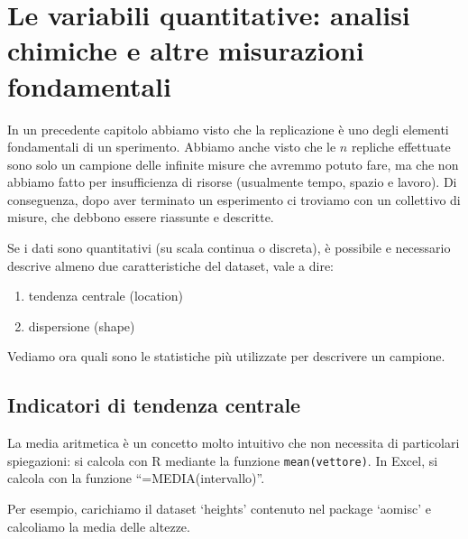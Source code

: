 \documentclass[a4paper,12pt,oneside]{book}
\providecommand{\tightlist}{%
  \setlength{\itemsep}{0pt}\setlength{\parskip}{0pt}}
\newenvironment{Shaded}{\begin{snugshade}}{\end{snugshade}}
\newcommand{\KeywordTok}[1]{\textcolor[rgb]{0.13,0.29,0.53}{\textbf{#1}}}
\newcommand{\OperatorTok}[1]{\textcolor[rgb]{0.81,0.36,0.00}{\textbf{#1}}}
\newcommand{\NormalTok}[1]{#1}
\begin{document}
\section{Le variabili quantitative: analisi chimiche e altre misurazioni
fondamentali}\label{le-variabili-quantitative-analisi-chimiche-e-altre-misurazioni-fondamentali}

In un precedente capitolo abbiamo visto che la replicazione è uno degli
elementi fondamentali di un sperimento. Abbiamo anche visto che le \(n\)
repliche effettuate sono solo un campione delle infinite misure che
avremmo potuto fare, ma che non abbiamo fatto per insufficienza di
risorse (usualmente tempo, spazio e lavoro). Di conseguenza, dopo aver
terminato un esperimento ci troviamo con un collettivo di misure, che
debbono essere riassunte e descritte.

Se i dati sono quantitativi (su scala continua o discreta), è possibile
e necessario descrive almeno due caratteristiche del dataset, vale a
dire:

\begin{enumerate}
\def\labelenumi{\arabic{enumi}.}
\tightlist
\item
  tendenza centrale (location)
\item
  dispersione (shape)
\end{enumerate}

Vediamo ora quali sono le statistiche più utilizzate per descrivere un
campione.

\subsection{Indicatori di tendenza
centrale}\label{indicatori-di-tendenza-centrale}

La media aritmetica è un concetto molto intuitivo che non necessita di
particolari spiegazioni: si calcola con R mediante la funzione
\texttt{mean(vettore)}. In Excel, si calcola con la funzione
``=MEDIA(intervallo)''.

Per esempio, carichiamo il dataset `heights' contenuto nel package
`aomisc' e calcoliamo la media delle altezze.

\begin{Shaded}
\end{Shaded}
\end{document}

